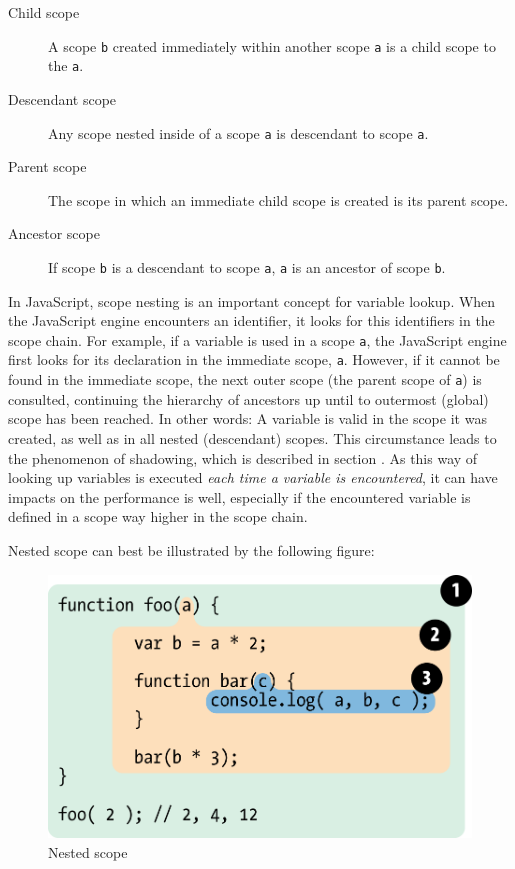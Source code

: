 \begin{description}
\item[Child scope]
A scope \texttt{b} created immediately within another scope \texttt{a}
is a child scope to the \texttt{a}.
\item[Descendant scope]
Any scope nested inside of a scope \texttt{a} is descendant to scope
\texttt{a}.
\item[Parent scope]
The scope in which an immediate child scope is created is its parent
scope.
\item[Ancestor scope]
If scope \texttt{b} is a descendant to scope \texttt{a}, \texttt{a} is
an ancestor of scope \texttt{b}.
\end{description}

In JavaScript, scope nesting is an important concept for variable
lookup. When the JavaScript engine encounters an identifier, it looks
for this identifiers in the scope chain. For example, if a variable is
used in a scope \texttt{a}, the JavaScript engine first looks for its
declaration in the immediate scope, \texttt{a}. However, if it cannot be
found in the immediate scope, the next outer scope (the parent scope of
\texttt{a}) is consulted, continuing the hierarchy of ancestors up until
to outermost (global) scope has been reached. In other words: A variable
is valid in the scope it was created, as well as in all nested
(descendant) scopes. This circumstance leads to the phenomenon of
shadowing, which is described in section
. As this way of looking up variables
is executed \emph{each time a variable is encountered}, it can have
impacts on the performance is well, especially if the encountered
variable is defined in a scope way higher in the scope chain.

Nested scope can best be illustrated by the following figure:

\begin{figure}[htbp]
\centering
\includegraphics{fig2.png}
\caption{Nested scope \cite{getify}}
\end{figure}

